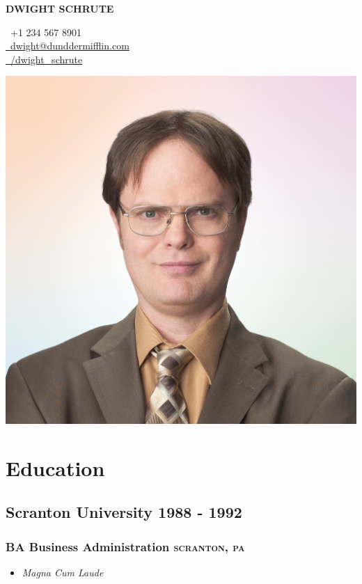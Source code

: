 \documentclass{article}
\newcommand{\rside}[1]{\hfill \normalfont\scshape\MakeLowercase{#1}}
\begin{document}
\begin{center}
  \begin{minipage}{0.45\textwidth}
    {\Huge\bfseries DWIGHT SCHRUTE}
  \end{minipage}\hfill
  \begin{minipage}{0.3\textwidth}
    \faPhone\ +1 234 567 8901 \\
    \href{mailto:abc@def.xyz}{\faEnvelope\ dwight@dunddermifflin.com} \\
    \href{https://linkedin.com}{\faLinkedin\ /dwight\_schrute}
  \end{minipage}
  \begin{minipage}{0.2\textwidth}
    \includegraphics[width=\linewidth]{dwight.png}
  \end{minipage}
\end{center}

\section{\faGraduationCap\enspace Education}
\subsection{Scranton University \rside{1988 - 1992}}
\subsubsection{BA Business Administration \rside{Scranton, PA}}
\begin{itemize}
  \item \textit{Magna Cum Laude}
\end{itemize}
\end{document}
